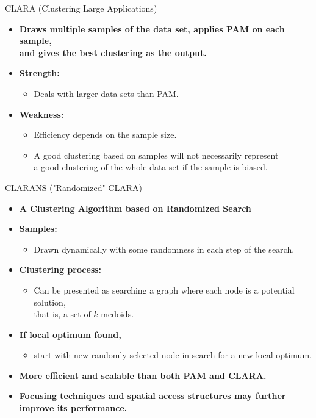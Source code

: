 \begin{frame}{CLARA (Clustering Large Applications)}
	\begin{itemize}
		\item \textbf{Draws multiple samples of the data set, applies PAM on
			      each sample,\\
			      and gives the best clustering as the output.}
		\item \textbf{Strength:}
		      \begin{itemize}
			      \item Deals with larger data sets than PAM.
		      \end{itemize}
		\item \textbf{Weakness:}
		      \begin{itemize}
			      \item Efficiency depends on the sample size.
			      \item A good clustering based on samples will not necessarily
			            represent \\
			            a good clustering of the whole data set if the sample is biased.
		      \end{itemize}
	\end{itemize}
\end{frame}

\begin{frame}{CLARANS ("Randomized" CLARA)}
	\begin{itemize}
		\item \textbf{A Clustering Algorithm based on Randomized Search}
		\item \textbf{Samples:}
		      \begin{itemize}
			      \item Drawn dynamically with some randomness in each step of the
			            search.
		      \end{itemize}
		\item \textbf{Clustering process:}
		      \begin{itemize}
			      \item Can be presented as searching a graph where each node is a
			            potential solution,\\
			            that is, a set of $k$ medoids.
		      \end{itemize}
		\item \textbf{If local optimum found,}
		      \begin{itemize}
			      \item start with new randomly selected node in search for a new
			            local optimum.
		      \end{itemize}
		\item \textbf{More efficient and scalable than both PAM and CLARA.}
		\item \textbf{Focusing techniques and spatial access structures may
			      further improve its performance.}
	\end{itemize}
\end{frame}
